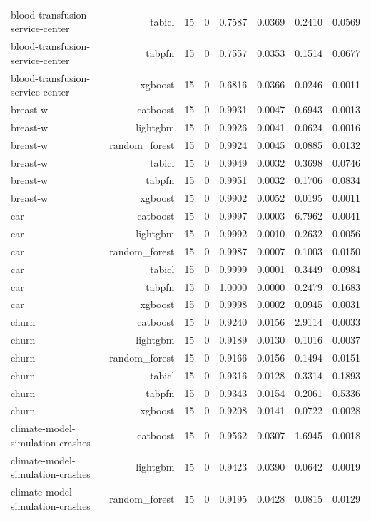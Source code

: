 \begin{table}[htbp]
\begin{tabular}{lrrrrrrr}
blood-transfusion-service-center & tabicl & 15 & 0 & 0.7587 & 0.0369 & 0.2410 & 0.0569 \\
blood-transfusion-service-center & tabpfn & 15 & 0 & 0.7557 & 0.0353 & 0.1514 & 0.0677 \\
blood-transfusion-service-center & xgboost & 15 & 0 & 0.6816 & 0.0366 & 0.0246 & 0.0011 \\
breast-w & catboost & 15 & 0 & 0.9931 & 0.0047 & 0.6943 & 0.0013 \\
breast-w & lightgbm & 15 & 0 & 0.9926 & 0.0041 & 0.0624 & 0.0016 \\
breast-w & random\_forest & 15 & 0 & 0.9924 & 0.0045 & 0.0885 & 0.0132 \\
breast-w & tabicl & 15 & 0 & 0.9949 & 0.0032 & 0.3698 & 0.0746 \\
breast-w & tabpfn & 15 & 0 & 0.9951 & 0.0032 & 0.1706 & 0.0834 \\
breast-w & xgboost & 15 & 0 & 0.9902 & 0.0052 & 0.0195 & 0.0011 \\
car & catboost & 15 & 0 & 0.9997 & 0.0003 & 6.7962 & 0.0041 \\
car & lightgbm & 15 & 0 & 0.9992 & 0.0010 & 0.2632 & 0.0056 \\
car & random\_forest & 15 & 0 & 0.9987 & 0.0007 & 0.1003 & 0.0150 \\
car & tabicl & 15 & 0 & 0.9999 & 0.0001 & 0.3449 & 0.0984 \\
car & tabpfn & 15 & 0 & 1.0000 & 0.0000 & 0.2479 & 0.1683 \\
car & xgboost & 15 & 0 & 0.9998 & 0.0002 & 0.0945 & 0.0031 \\
churn & catboost & 15 & 0 & 0.9240 & 0.0156 & 2.9114 & 0.0033 \\
churn & lightgbm & 15 & 0 & 0.9189 & 0.0130 & 0.1016 & 0.0037 \\
churn & random\_forest & 15 & 0 & 0.9166 & 0.0156 & 0.1494 & 0.0151 \\
churn & tabicl & 15 & 0 & 0.9316 & 0.0128 & 0.3314 & 0.1893 \\
churn & tabpfn & 15 & 0 & 0.9343 & 0.0154 & 0.2061 & 0.5336 \\
churn & xgboost & 15 & 0 & 0.9208 & 0.0141 & 0.0722 & 0.0028 \\
climate-model-simulation-crashes & catboost & 15 & 0 & 0.9562 & 0.0307 & 1.6945 & 0.0018 \\
climate-model-simulation-crashes & lightgbm & 15 & 0 & 0.9423 & 0.0390 & 0.0642 & 0.0019 \\
climate-model-simulation-crashes & random\_forest & 15 & 0 & 0.9195 & 0.0428 & 0.0815 & 0.0129 \\

\end{tabular}
\end{table}
